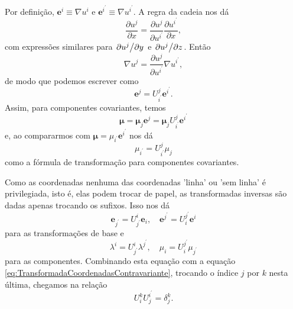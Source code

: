 Por definição, $\mathbf{e}^{i} \equiv \nabla u^{i} \text { e } \mathbf{e}^{i^{\prime}} \equiv \nabla u^{i^{\prime}}$. A regra da cadeia nos dá
\[
	\frac{\partial u^{j}}{\partial x}=\frac{\partial u^{j}}{\partial u^{i^{\prime}}} \frac{\partial u^{i^{\prime}}}{\partial x},
\]
com expressões similares para $\pdv*{u^j}{y}$ e $\pdv*{u^j}{z}$. Então
\[
	\nabla u^{j}=\frac{\partial u^{j}}{\partial u^{i^{\prime}}} \nabla u^{i^{\prime}},
\]
de modo que podemos escrever como
\begin{equation}\label{eq:TransformadaCovarianteBase}
	\mathbf{e}^{j} = U^{j}_{i^\prime} \mathbf{e}^{i^\prime}.
\end{equation}
Assim, para componentes covariantes, temos
\[
	\boldsymbol{\mu}=\boldsymbol{\mu}_{j} \mathbf{e}^{j}=\boldsymbol{\mu}_{j} U_{i^{\prime}}^{j} \mathbf{e}^{i^{\prime}}
\]
e, ao compararmos com $\mathbf{\mu}=\mu_{i^\prime}\mathbf{e}^{i^\prime}$ nos dá
\begin{equation}\label{eq:TransformadaCoordenadasCovariante}
	\boxed{
		\mu_{i^\prime} = U^{j}_{i^\prime} \mu_j
	}
\end{equation}
como a fórmula de transformação para componentes covariantes.

Como as coordenadas nenhuma das coordenadas 'linha' ou 'sem linha' é privilegiada, isto é, elas podem trocar de papel, as transformadas inversas são dadas apenas trocando os sufixos. Isso nos dá
\begin{equation}\label{eq:TransformadasBaseInversa}
	\mathbf{e}_{j^{\prime}}=U_{j^{\prime}}^{i} \mathbf{e}_{i}, \quad \mathbf{e}^{j^{\prime}}=U_{i}^{j^{\prime}} \mathbf{e}^{i} 
\end{equation}
para as transformações de base e
\begin{equation}\label{eq:TransformadasCoordenadasInversas}
	\lambda^{i}=U_{j^{\prime}}^{i} \lambda^{j^{\prime}}, \quad \mu_{i}=U_{i}^{j^{\prime}} \mu_{j^{\prime}}
\end{equation}
para as componentes. Combinando esta equação com a equação \eqref{eq:TransformadaCoordenadasContravariante}, trocando o índice $j$ por $k$ nesta última, chegamos na relação
\begin{equation}
	\boxed{
		U_{i}^{k} U_{j}^{i^{\prime}}=\delta_{j}^{k} .
	}
\end{equation}

